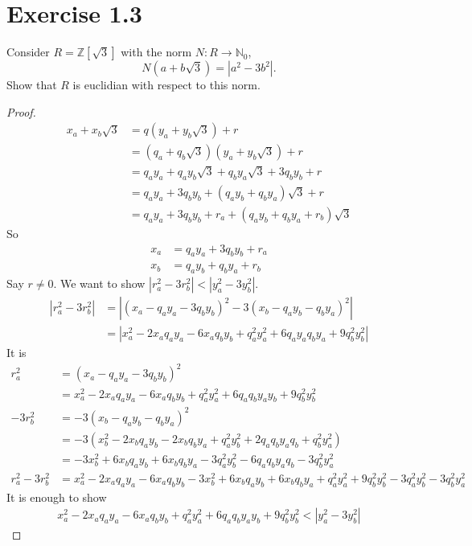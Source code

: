 \documentclass[a4paper]{article}
\begin{document}
\section*{Exercise 1.3}
Consider \(R = \mathbb{Z}[\sqrt{3}]\) with the norm \(N: R \longrightarrow \mathbb{N}_0\),
\begin{equation*}
  N(a + b\sqrt{3}) = |a^2 - 3b^2| \text{.}
\end{equation*}
Show that \(R\) is euclidian with respect to this norm.
\begin{proof}
  \begin{align*}
    x_a + x_b \sqrt{3} &= q (y_a + y_b \sqrt{3}) + r \\
    &= (q_a + q_b \sqrt{3})(y_a + y_b \sqrt{3}) + r \\
    &= q_a y_a + q_a y_b \sqrt{3} + q_b y_a \sqrt{3} + 3 q_b y_b + r \\
    &= q_a y_a + 3 q_b y_b + (q_a y_b + q_b y_a) \sqrt{3} + r \\
    &= q_a y_a + 3 q_b y_b + r_a + (q_a y_b + q_b y_a + r_b) \sqrt{3}
  \end{align*}
  So
  \begin{align*}
    x_a &= q_a y_a + 3 q_b y_b + r_a \\
    x_b &= q_a y_b + q_b y_a + r_b
  \end{align*}
  Say \(r \neq 0\). We want to show \(|r_a^2 - 3r_b^2| < |y_a^2 - 3y_b^2|\).
  \begin{align*}
    |r^2_a - 3r^2_b| &= |(x_a - q_a y_a - 3 q_b y_b)^2 - 3(x_b - q_a y_b - q_b y_a)^2| \\
    &= |x_a^2 - 2x_a q_a y_a - 6x_a q_b y_b + q_a^2 y_a^2 + 6q_a y_a q_b y_a + 9q_b^2 y_b^2|
  \end{align*}
  It is
  \begin{align*}
    r_a^2 &= (x_a - q_a y_a - 3 q_b y_b)^2 \\
    &= x_a^2 - 2x_a q_a y_a - 6x_a q_b y_b + q_a^2 y_a^2 + 6q_a q_b y_a y_b + 9q_b^2 y_b^2 \\
    -3r_b^2 &= -3(x_b - q_a y_b - q_b y_a)^2 \\
    &= -3(x_b^2 - 2x_b q_a y_b - 2x_b q_b y_a + q_a^2 y_b^2 + 2 q_a q_b y_a q_b + q_b^2 y_a^2) \\
    &= -3x_b^2 + 6x_b q_a y_b + 6 x_b q_b y_a - 3q_a^2 y_b^2 - 6 q_a q_b y_a q_b - 3q_b^2 y_a^2 \\
    r_a^2 - 3r_b^2 &= x_a^2 - 2x_a q_a y_a - 6x_a q_b y_b -3x_b^2 + 6x_b q_a y_b + 6 x_b q_b y_a + q_a^2 y_a^2 + 9q_b^2 y_b^2 - 3q_a^2 y_b^2 - 3q_b^2 y_a^2
  \end{align*}
  It is enough to show
  \begin{align*}
    x_a^2 - 2x_a q_a y_a - 6x_a q_b y_b + q_a^2 y_a^2 + 6q_a q_b y_a y_b + 9q_b^2 y_b^2 < |y^2_a - 3y_b^2|
  \end{align*}
\end{proof}
\end{document}
